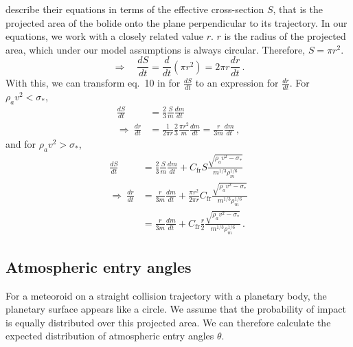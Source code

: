 \cite{avramenko2014simulation} describe their equations in terms of the effective cross-section $S$, that is the projected area of the bolide onto the plane perpendicular to its trajectory. In our equations, we work with a closely related value $r$. $r$ is the radius of the projected area, which under our model assumptions is always circular. Therefore, $S = \pi r^2$.
\begin{equation}
    \Rightarrow \quad \frac{dS}{dt} = \frac{d}{dt}\left(\pi r^2\right) = 2\pi r \frac{dr}{dt}\,.
\end{equation}
With this, we can transform eq.~10 in \cite{avramenko2014simulation} for $\frac{dS}{dt}$ to an expression for $\frac{dr}{dt}$.
For $\rho_a v^2 < \sigma_*$,
\begin{align}
    \frac{dS}{dt} &= \frac{2}{3} \frac{S}{m} \frac{dm}{dt} \nonumber\\
    \Rightarrow\ \frac{dr}{dt} &= \frac{1}{2\pi r} \frac{2}{3} \frac{\pi r^2}{m} \frac{dm}{dt} = \frac{r}{3m} \frac{dm}{dt}\,,
\end{align}
and for $\rho_a v^2 > \sigma_*$,
\begin{align}
    \frac{dS}{dt} &= \frac{2}{3} \frac{S}{m} \frac{dm}{dt} + C_\mathrm{fr}S\frac{\sqrt{\rho_a v^2 - \sigma_*}}{m^{1/3}\rho_m^{1/6}} \nonumber\\
    \Rightarrow\ \frac{dr}{dt} &= \frac{r}{3m} \frac{dm}{dt} + \frac{\pi r^2}{2\pi r} C_\mathrm{fr}\frac{\sqrt{\rho_a v^2 - \sigma_*}}{m^{1/3}\rho_m^{1/6}} \nonumber\\
    &= \frac{r}{3m} \frac{dm}{dt} +  C_\mathrm{fr} \frac{r}{2} \frac{\sqrt{\rho_a v^2 - \sigma_*}}{m^{1/3}\rho_m^{1/6}}\,.
\end{align}

\subsection{Atmospheric entry angles}
For a meteoroid on a straight collision trajectory with a planetary body, the planetary surface appears like a circle. We assume that the probability of impact is equally distributed over this projected area. We can therefore calculate the expected distribution of atmospheric entry angles $\theta$.

